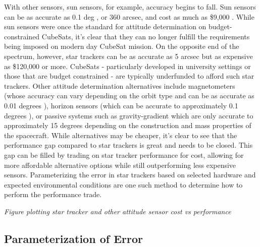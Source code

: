 \par \qquad With other sensors, sun sensors, for example, accuracy begins to fall.
Sun sensors can be as accurate as 0.1 deg \cite{SunSensorA}, or 360 arcsec, and cost as much as \$9,000 \cite{CubeSatShop_SunSensor}. 
While sun sensors were once the standard for attitude determination on budget-constrained CubeSats, it's clear that they can no longer fulfill the requirements being imposed on modern day CubeSat mission.
On the opposite end of the spectrum, however, star trackers can be as accurate as 5 arcsec but as expensive as \$120,000 \cite{RocketLabStarTracker} or more.
CubeSats - particularly developed in university settings or those that are budget constrained - are typically underfunded to afford such star trackers.
Other attitude determination alternatives include magnetometers (whose accuracy can vary depending on the orbit type and can be as accurate as 0.01 degrees \cite{Magnetometer}), horizon sensors (which can be accurate to approximately 0.1 degrees \cite{HorizonSensor}), or passive systems such as gravity-gradient which are only accurate to approximately 15 degrees \cite{GravityGradient} depending on the construction and mass properties of the spacecraft.
While alternatives may be cheaper, it's clear to see that the performance gap compared to star trackers is great and needs to be closed. 
This gap can be filled by trading on star tracker performance for cost, allowing for more affordable alternative options while still outperforming less expensive sensors.
Parameterizing the error in star trackers based on selected hardware and expected environmental conditions are one such method to determine how to perform the performance trade.

\begin{center}
    \emph{Figure plotting star tracker and other attitude sensor cost vs performance}
\end{center}

\subsection*{Parameterization of Error}

